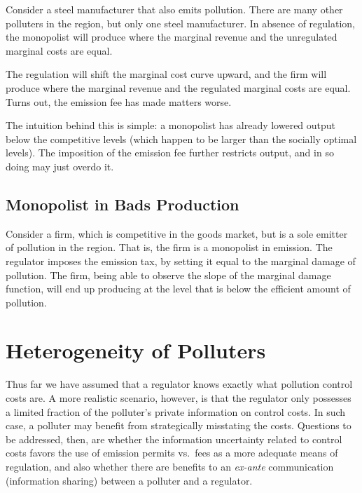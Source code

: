 \documentclass[
]{book}
\begin{document}
Consider a steel manufacturer that also emits pollution. There are many other polluters in the region, but only one steel manufacturer. In absence of regulation, the monopolist will produce where the marginal revenue and the unregulated marginal costs are equal.

The regulation will shift the marginal cost curve upward, and the firm will produce where the marginal revenue and the regulated marginal costs are equal. Turns out, the emission fee has made matters worse.

The intuition behind this is simple: a monopolist has already lowered output below the competitive levels (which happen to be larger than the socially optimal levels). The imposition of the emission fee further restricts output, and in so doing may just overdo it.

\hypertarget{monopolist-in-bads-production}{%
\subsection{Monopolist in Bads Production}\label{monopolist-in-bads-production}}

Consider a firm, which is competitive in the goods market, but is a sole emitter of pollution in the region. That is, the firm is a monopolist in emission. The regulator imposes the emission tax, by setting it equal to the marginal damage of pollution. The firm, being able to observe the slope of the marginal damage function, will end up producing at the level that is below the efficient amount of pollution.

\hypertarget{heterogeneity-of-polluters}{%
\section{Heterogeneity of Polluters}\label{heterogeneity-of-polluters}}

Thus far we have assumed that a regulator knows exactly what pollution control costs are. A more realistic scenario, however, is that the regulator only possesses a limited fraction of the polluter's private information on control costs. In such case, a polluter may benefit from strategically misstating the costs. Questions to be addressed, then, are whether the information uncertainty related to control costs favors the use of emission permits vs.~fees as a more adequate means of regulation, and also whether there are benefits to an \emph{ex-ante} communication (information sharing) between a polluter and a regulator.
\end{document}

